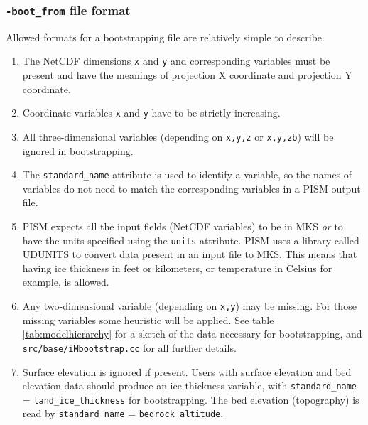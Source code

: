 \documentclass[titlepage,letterpaper,final]{scrartcl}
\begin{document}
\subsubsection*{\texttt{-boot_from} file format}
\label{sec:bootstrapping-format}  Allowed formats for a bootstrapping file are relatively simple to describe. 
\begin{enumerate}
\item The NetCDF dimensions \texttt{x} and \texttt{y} and corresponding variables must be present and have the meanings of projection X coordinate and projection Y coordinate.
\item Coordinate variables \texttt{x} and \texttt{y} have to be strictly increasing.
\item All three-dimensional variables (depending on \texttt{x,y,z} or \texttt{x,y,zb}) will be ignored in bootstrapping.
\item The \texttt{standard_name} attribute is used to identify a variable, so the names of variables do not need to match the corresponding variables in a PISM output file.
\item PISM expects all the input fields (NetCDF variables) to be in MKS \emph{or} to have the units specified using the \texttt{units} attribute.  PISM uses a library called UDUNITS to convert data present in an input file to MKS.   This means that having ice thickness in feet or kilometers, or temperature in Celsius for example, is allowed.
\item Any two-dimensional variable (depending on \texttt{x,y}) may be missing.  For those missing variables some heuristic will be applied.  See table \ref{tab:modelhierarchy} for a sketch of the data necessary for bootstrapping, and \texttt{src/base/iMbootstrap.cc} for all further details.
\item Surface elevation is ignored if present.  Users with surface elevation and bed elevation data should produce an ice thickness variable, with \texttt{standard_name} = \texttt{land_ice_thickness} for bootstrapping.  The bed elevation (topography) is read by \texttt{standard_name} = \texttt{bedrock_altitude}.
\end{enumerate}
\end{document}
